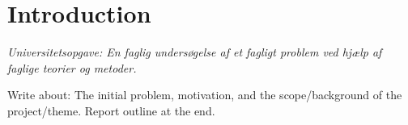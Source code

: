 \chapter{Introduction}\label{cha:introduction}
\textit{Universitetsopgave: En faglig undersøgelse af et fagligt problem ved hjælp af faglige teorier og metoder.}

Write about: The initial problem, motivation, and the scope/background of the project/theme. Report outline at the end. 


